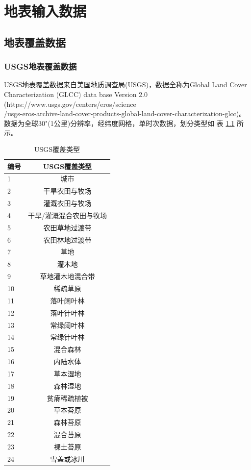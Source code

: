 \chapter{地表输入数据}\label{地表输入数据}

\section{地表覆盖数据}\label{地表覆盖数据}
\subsection{USGS地表覆盖数据}\label{USGS地表覆盖数据}
USGS地表覆盖数据来自美国地质调查局(USGS)，数据全称为Global Land Cover Characterization (GLCC) data base Version 2.0 
(https://www.usgs.gov/centers/eros/science\\/usgs-eros-archive-land-cover-products-global-land-cover-characterization-glcc)。
数据为全球30"(1公里)分辨率，经纬度网格，单时次数据，划分类型如 表 \ref{tab:USGS覆盖类型} 所示。
\begin{table}[]
\centering
\caption{USGS覆盖类型}
\label{tab:USGS覆盖类型}
\begin{tabular}{@{}lc@{}}
\toprule
编号 & USGS覆盖类型     \\ \midrule
1  & 城市           \\
2  & 干旱农田与牧场      \\
3  & 灌溉农田与牧场      \\
4  & 干旱/灌溉混合农田与牧场 \\
5  & 农田草地过渡带      \\
6  & 农田林地过渡带      \\
7  & 草地           \\
8  & 灌木地          \\
9  & 草地灌木地混合带     \\
10 & 稀疏草原         \\
11 & 落叶阔叶林        \\
12 & 落叶针叶林        \\
13 & 常绿阔叶林        \\
14 & 常绿针叶林        \\
15 & 混合森林         \\
16 & 内陆水体         \\
17 & 草本湿地         \\
18 & 森林湿地         \\
19 & 贫瘠稀疏植被       \\
20 & 草本苔原         \\
21 & 森林苔原         \\
22 & 混合苔原         \\
23 & 裸土苔原         \\
24 & 雪盖或冰川        \\ \bottomrule
\end{tabular}
\end{table}



